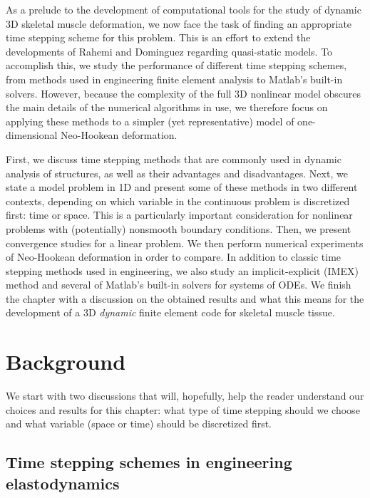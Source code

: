 \documentclass{sfuthesis}
\numberwithin{equation}{section}
\numberwithin{figure}{chapter}
\numberwithin{table}{chapter}
\theoremstyle{definition}
\begin{document}

As a prelude to the development of computational tools for the study of dynamic 3D skeletal muscle deformation, we now face the task of finding an appropriate time stepping scheme for this problem. This is an effort to extend the developments of Rahemi \cite{Hadi} and Dominguez \cite{Seba} regarding quasi-static models.  
To accomplish this, we study the performance of different time stepping schemes, from methods used in engineering finite element analysis to Matlab's built-in solvers. 
However, because the complexity of the full 3D nonlinear model obscures the main details of the numerical algorithms in use, we therefore focus on applying these methods to a simpler (yet representative) model of one-dimensional Neo-Hookean deformation.

First, we discuss time stepping methods that are commonly used in dynamic analysis of structures, as well as their advantages and disadvantages. Next, we state a model problem in 1D and present some of these methods in two different contexts, depending on which variable in the continuous problem is discretized first: time or space. This is a particularly important consideration for nonlinear problems with (potentially) nonsmooth boundary conditions. Then, we present convergence studies for a linear problem. We then perform numerical experiments of Neo-Hookean deformation in order to compare. In addition to classic time stepping methods used in engineering, we also study an implicit-explicit (IMEX) method and several of Matlab's built-in solvers for systems of ODEs. We finish the chapter with a discussion on the obtained results and what this means for the development of a 3D \textit{dynamic} finite element code for skeletal muscle tissue.

\section{Background}

We start with two discussions that will, hopefully, help the reader understand our choices and results for this chapter: what type of time stepping should we choose and what variable (space or time) should be discretized first.

\subsection{Time stepping schemes in engineering elastodynamics}
\end{document}

